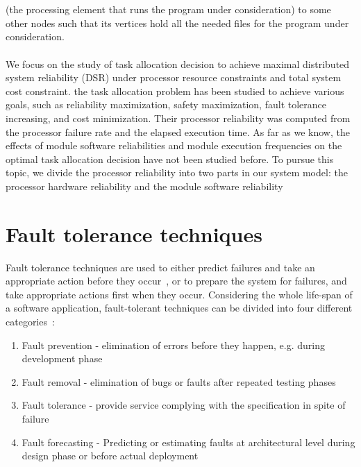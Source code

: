 \documentclass{cslthse-msc}
\begin{document}
\\\\
(the processing element that runs the program under consideration) to some other nodes such that its vertices hold all the needed files for the program under consideration. \cite{relAnalysisFRA}
\\\\
We focus on the study of task allocation decision to achieve maximal distributed system reliability (DSR) under processor resource constraints and total system cost constraint. the task allocation problem has been studied to achieve various goals, such as reliability maximization, safety maximization, fault tolerance increasing, and cost minimization. Their processor reliability was computed from the processor failure rate and the elapsed execution time. As far as we know, the effects of module software reliabilities and module execution frequencies on the optimal task allocation decision have not been studied before. To pursue this topic, we divide the processor reliability into two parts in our system model: the processor hardware reliability and the module software reliability \cite{decisionModelTaskAllocation}
\fi

\section{Fault tolerance techniques} \label{sec:background_fault_tol_tech}
Fault tolerance techniques are used to either predict failures and take an appropriate action before they occur~\cite{faultToleranceChallenges}, or to prepare the system for failures, and take appropriate actions first when they occur. Considering the whole life-span of a software application, fault-tolerant techniques can be divided into four different categories~\cite{surveyReliabilityDistr}:

\begin{enumerate}
\item Fault prevention - elimination of errors before they happen, e.g. during development phase
\item Fault removal - elimination of bugs or faults after repeated testing phases
\item Fault tolerance - provide service complying with the specification in spite of failure
\item Fault forecasting - Predicting or estimating faults at architectural level during design phase or before actual deployment
\end{enumerate}
\end{document}
